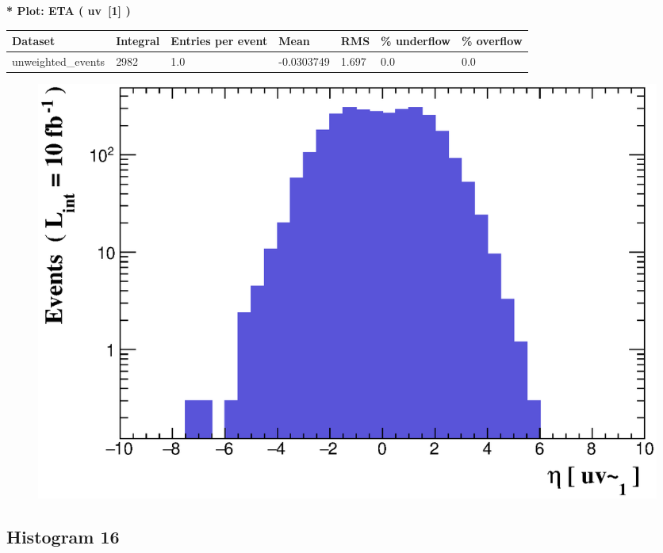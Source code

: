 \documentclass[a4paper, 10pt]{article}
\begin{document}
\textbf{* Plot: ETA ( uv~[1] ) }\\
   \begin{table}[H]
  \begin{center}
    \begin{tabular}{|m{23.0mm}|m{23.0mm}|m{18.0mm}|m{19.0mm}|m{19.0mm}|m{19.0mm}|m{19.0mm}|}
      \hline
      {\cellcolor{yellow}         Dataset}& {\cellcolor{yellow}         Integral}& {\cellcolor{yellow}         Entries per event}& {\cellcolor{yellow}         Mean}& {\cellcolor{yellow}         RMS}& {\cellcolor{yellow}         \% underflow}& {\cellcolor{yellow}         \% overflow}\\
      \hline
      {\cellcolor{white}         unweighted\_events}& {\cellcolor{white}         2982}& {\cellcolor{white}         1.0}& {\cellcolor{white}         -0.0303749}& {\cellcolor{white}         1.697}& {\cellcolor{green}         0.0}& {\cellcolor{green}         0.0}\\
\hline
    \end{tabular}
  \end{center}
\end{table}

\begin{figure}[H]
  \begin{center}
    \includegraphics[scale=0.45]{selection_14.eps}\\
\caption{   }
  \end{center}
\end{figure}
      \newpage
\subsection{ Histogram 16}
\end{document}
